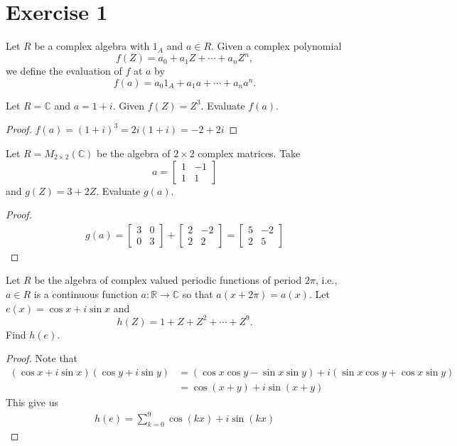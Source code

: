\documentclass{report}
\begin{document}
\section{Exercise 1}
\begin{mdframed}

Let $R$ be a complex algebra with $1_A$ and $a \in R$. Given a complex polynomial 
\[ 
f(Z) = a_0 + a_1 Z + \cdots + a_n Z^n,
\]
we define the evaluation of $f$ at $a$ by
\[
f(a) = a_0 1_A + a_1 a + \cdots + a_n a^n.
\]
\end{mdframed}
\begin{question}{}{}
Let $R = \mathbb{C}$ and $a = 1 + i$. Given $f(Z) = Z^3$. Evaluate $f(a)$.
\end{question}
\begin{proof}
   $f(a)=(1+i)^3=2i(1+i)=-2+2i$ 
\end{proof}
\begin{question}{}{}
Let $R = M_{2 \times 2}(\mathbb{C})$ be the algebra of $2 \times 2$ complex matrices. Take 
    \[
    a = \begin{bmatrix} 1 & -1 \\ 1 & 1 \end{bmatrix}
    \]
    and $g(Z) = 3 + 2Z$. Evaluate $g(a)$.
    
\end{question}
\begin{proof}

  \begin{align*}
  g(a)=\begin{bmatrix}
    3 & 0\\
    0 & 3 
  \end{bmatrix} + \begin{bmatrix}
    2 & -2 \\
    2 & 2
  \end{bmatrix}= \begin{bmatrix}
    5 & -2 \\
    2 & 5
  \end{bmatrix}
  \end{align*}
\end{proof}
\begin{question}{}{}
Let $R$ be the algebra of complex valued periodic functions of period $2\pi$, i.e., $a \in R$ is a continuous function $a : \mathbb{R} \to \mathbb{C}$ so that $a(x + 2\pi) = a(x)$. Let $e(x) = \cos x + i \sin x$ and 
    \[
    h(Z) = 1 + Z + Z^2 + \cdots + Z^9.
    \]
    Find $h(e)$.
\end{question}
\begin{proof}
Note that 
\begin{align*}
  (\cos x+ i \sin x)(\cos y+i \sin y)&= (\cos x \cos y- \sin x \sin y)+i (\sin x \cos y + \cos x \sin y)\\
  &=\cos (x+y)+ i \sin (x+y)
\end{align*}
This give us 
\begin{align*}
h(e)=\sum_{k=0}^{9} \cos (kx)+ i \sin (kx) 
\end{align*}
\end{proof}
\end{document}
